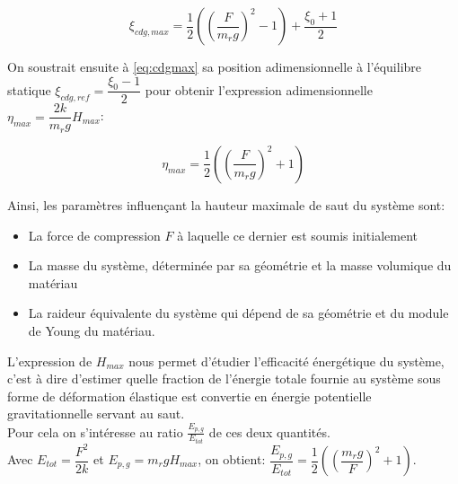 \begin{equation}
  \xi_{cdg,max}=\frac{1}{2}((\frac{F}{m_r g})^2-1)+\frac{\xi_0+1}{2}
  \label{eq:cdgmax}
\end{equation}

On soustrait ensuite à \ref{eq:cdgmax} sa position adimensionnelle à l'équilibre statique $\xi_{cdg,ref}=\dfrac{\xi_0-1}{2}$ pour obtenir l'expression adimensionnelle $\eta_{max}=\dfrac{2k}{m_rg}H_{max}$:


\begin{equation}
\eta_{max}=\frac{1}{2}((\frac{F}{m_r g})^2+1)
 \label{eq:hmax}
\end{equation}


Ainsi, les paramètres influençant la hauteur maximale de saut du système sont:
\begin{itemize}
    \item La force de compression $F$ à laquelle ce dernier est soumis initialement
    \item La masse du système, déterminée par sa géométrie et la masse volumique du matériau
    \item La raideur équivalente du système qui dépend de sa géométrie et du module de Young du matériau.
\end{itemize}

L'expression de $H_{max}$ nous permet d'étudier l'efficacité énergétique du système, c'est à dire d'estimer quelle fraction de l'énergie totale fournie au système sous forme de déformation élastique est convertie en énergie potentielle gravitationnelle servant au saut. \\
Pour cela on s'intéresse au ratio $\frac{E_{p,g}}{E_{tot}}$ de ces deux quantités. \\
Avec $E_{tot}=\dfrac{F^2}{2k}$ et $E_{p,g}=m_r g H_{max}$, on obtient:  $\dfrac{E_{p,g}}{E_{tot}}=\dfrac{1}{2}((\dfrac{m_r g}{F})^2+1)$.

